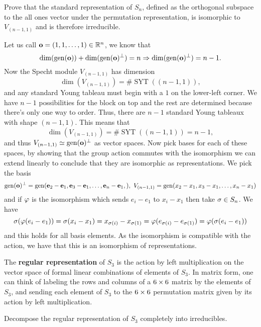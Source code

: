 \documentclass[12pt]{memoir}
\DeclareMathOperator{\SYT}{SYT}
\begin{document}
\begin{Ej}[Exercise 4]
    Prove that the standard representation of $S_n$, defined as the orthogonal subspace to the all
ones vector under the permutation representation, is isomorphic to $V_{(n-1,1)}$ and is therefore irreducible.
\end{Ej}

\begin{ptcbr}
    Let us call $\mathbf{o}=(1,1,\dots,1)\in\mathbb{R}^n$, we know that 
    $$\dim(\operatorname{gen}(\mathbf{o}))+\dim(\operatorname{gen}(\mathbf{o})^\perp)=n\Rightarrow \dim(\operatorname{gen}(\mathbf{o})^\perp)=n-1.$$
    Now the Specht module $V_{(n-1,1)}$ has dimension 
    $$\dim(V_{(n-1,1)})=\#\SYT((n-1,1)),$$
    and any standard Young tableau must begin with a $1$ on the lower-left corner. We have $n-1$ possibilities for the block on top and the rest are determined because there's only one way to order. Thus, there are $n-1$ standard Young tableaux with shape $(n-1,1)$. This means that
    $$\dim(V_{(n-1,1)})=\#\SYT((n-1,1))=n-1,$$
    and thus $V_{(n-1,1)}\simeq \operatorname{gen}(\mathbf{o})^\perp$ as vector spaces. Now pick bases for each of these spaces, by showing that the group action commutes with the isomorphism we can extend linearly to conclude that they are isomorphic as representations. We pick the basis 
    $$\gen(\vec{o})^\perp=\gen(\vec e_2-\vec e_1,\vec e_3-\vec e_1,\dots,\vec e_n-\vec e_1,),\ V_{(n-1,1)}=\gen(x_2-x_1,x_3-x_1,\dots,x_n-x_1)$$
    and if $\varphi$ is the isomorphism which sends $e_i-e_1$ to $x_i-x_1$ then take $\sigma\in S_n$. We have 
    $$\sigma(\varphi(e_i-e_1))=\sigma(x_i-x_1)=x_{\sigma(i)}-x_{\sigma(1)}=\varphi(e_{\sigma(i)}-e_{\sigma(1)})=\varphi(\sigma(e_i-e_1))$$
    and this holds for all basis elements. As the isomorphism is compatible with the action, we have that this is an isomorphism of representations.
\end{ptcbr}
\iffalse
\begin{Ej}[Exercise 5]
    The \textbf{regular representation} of $S_3$ is the action by left multiplication on the vector space of formal linear combinations of elements of $S_3$. In matrix form, one can think of labeling the
rows and columns of a $6\times 6$ matrix by the elements of $S_3$, and sending each element of $S_3$ to the $6\times 6$
permutation matrix given by its action by left multiplication.\par
Decompose the regular representation of $S_3$ completely into irreducibles.
\end{Ej}
\end{document}
